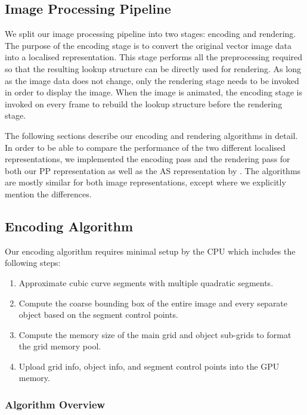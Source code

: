 \documentclass[11pt,a4paper,twoside]{article}
\begin{document}
\subsection {Image Processing Pipeline}

We split our image processing pipeline into two stages: encoding and rendering. The purpose of the encoding stage is to convert the original vector image data into a localised representation. This stage performs all the preprocessing required so that the resulting lookup structure can be directly used for rendering. As long as the image data does not change, only the rendering stage needs to be invoked in order to display the image. When the image is animated, the encoding stage is invoked on every frame to rebuild the lookup structure before the rendering stage.

The following sections describe our encoding and rendering algorithms in detail. In order to be able to compare the performance of the two different localised representations, we implemented the encoding pass and the rendering pass for both our PP representation as well as the AS representation by \cite{NehabHoppe08}. The algorithms are mostly similar for both image representations, except where we explicitly mention the differences.

\subsection {Encoding Algorithm}

Our encoding algorithm requires minimal setup by the CPU which includes the following steps:

\begin {enumerate}
\item
Approximate cubic curve segments with multiple quadratic segments.
\item
Compute the coarse bounding box of the entire image and every separate object based on the segment control points.
\item
Compute the memory size of the main grid and object sub-grids to format the grid memory pool.
\item
Upload grid info, object info, and segment control points into the GPU memory.
\end {enumerate}


\subsubsection {Algorithm Overview}
\end{document}
